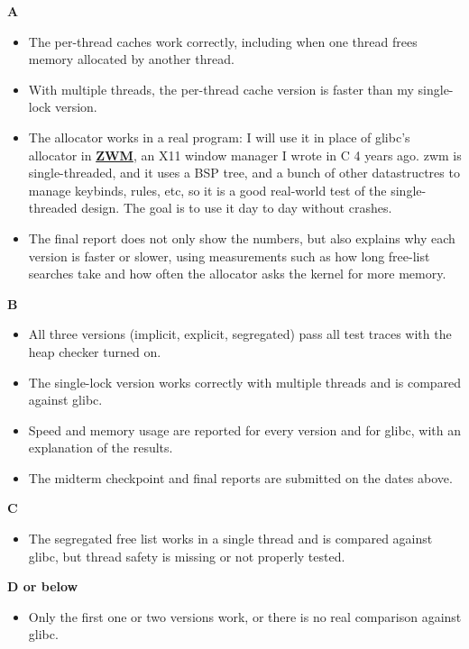 \documentclass[12pt,letterpaper]{article}
\newcommand{\proposalfield}[1]{%
  \par\medskip\noindent\textbf{#1}\par\smallskip
}
\begin{document}
\proposalfield{A}
\begin{itemize}
    \item The per-thread caches work correctly, including when one thread frees memory allocated by another thread.
    \item With multiple threads, the per-thread cache version is faster than my single-lock version.
    \item The allocator works in a real program: I will use it in place of glibc's allocator in \href{https://github.com/yazeed1s/zwm}{\textbf{ZWM}}, an X11 window manager I wrote in C 4 years ago. zwm is single-threaded, and it uses a BSP tree, and a bunch of other datastructres to manage keybinds, rules, etc, so it is a good real-world test of the single-threaded design. The goal is to use it day to day without crashes.
    \item The final report does not only show the numbers, but also explains why each version is faster or slower, using measurements such as how long free-list searches take and how often the allocator asks the kernel for more memory.
\end{itemize}

\proposalfield{B}
\begin{itemize}
    \item All three versions (implicit, explicit, segregated) pass all test traces with the heap checker turned on.
    \item The single-lock version works correctly with multiple threads and is compared against glibc.
    \item Speed and memory usage are reported for every version and for glibc, with an explanation of the results.
    \item The midterm checkpoint and final reports are submitted on the dates above.
\end{itemize}

\proposalfield{C}
\begin{itemize}
    \item The segregated free list works in a single thread and is compared against glibc, but thread safety is missing or not properly tested.
\end{itemize}

\proposalfield{D or below}
\begin{itemize}
    \item Only the first one or two versions work, or there is no real comparison against glibc.
\end{itemize}
\end{document}
